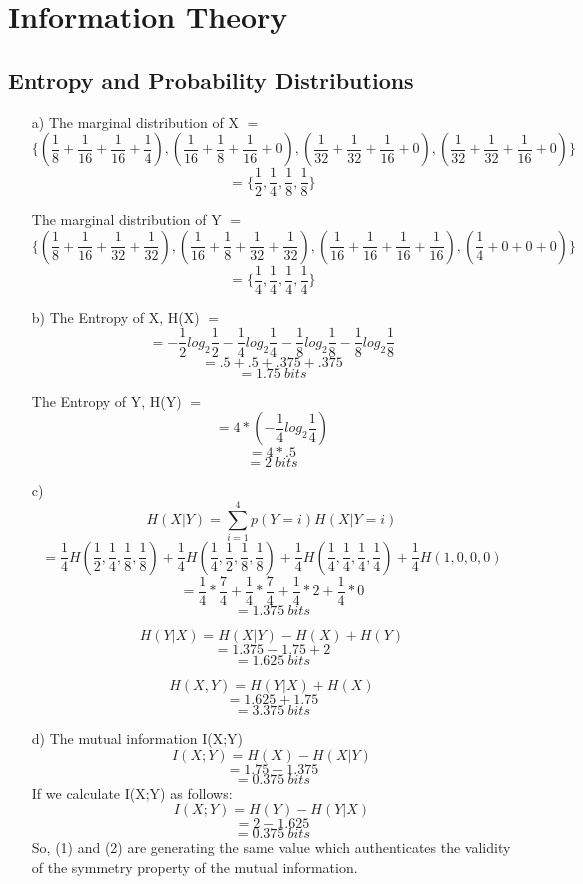 \documentclass{article}
\begin{document}
\section{Information Theory}
\subsection{Entropy and Probability Distributions}
\begin{itemize}
	\item[a)]
	The marginal distribution of X $=$ $$\{(\frac{1}{8}+\frac{1}{16}+\frac{1}{16}+\frac{1}{4}),(\frac{1}{16}+\frac{1}{8}+\frac{1}{16}+0),(\frac{1}{32}+\frac{1}{32}+\frac{1}{16}+0),(\frac{1}{32}+\frac{1}{32}+\frac{1}{16}+0)\}$$
	$$=\{\frac{1}{2},\frac{1}{4},\frac{1}{8},\frac{1}{8}\}$$
	
	The marginal distribution of Y $=$ $$\{(\frac{1}{8}+\frac{1}{16}+\frac{1}{32}+\frac{1}{32}),(\frac{1}{16}+\frac{1}{8}+\frac{1}{32}+\frac{1}{32}),(\frac{1}{16}+\frac{1}{16}+\frac{1}{16}+\frac{1}{16}),(\frac{1}{4}+0+0+0)\}$$
	$$=\{\frac{1}{4},\frac{1}{4},\frac{1}{4},\frac{1}{4}\}$$
	
	\item[b)]
	The Entropy of X, H(X) $=$ 
	$$=-\frac{1}{2}log_2\frac{1}{2}-\frac{1}{4}log_2\frac{1}{4}-\frac{1}{8}log_2\frac{1}{8}-\frac{1}{8}log_2\frac{1}{8}$$
	$$=.5+.5+.375+.375$$
	$$=1.75\: bits$$
	
	The Entropy of Y, H(Y) $=$ 
	$$=4*(-\frac{1}{4}log_2\frac{1}{4})$$
	$$=4*.5$$
	$$=2\: bits$$
	\item[c)]
	$$H(X|Y)=\sum_{i=1}^{4} p(Y=i) H(X|Y=i)$$
	$$=\frac{1}{4}H(\frac{1}{2},\frac{1}{4},\frac{1}{8},\frac{1}{8})+\frac{1}{4}H(\frac{1}{4},\frac{1}{2},\frac{1}{8},\frac{1}{8})+\frac{1}{4}H(\frac{1}{4},\frac{1}{4},\frac{1}{4},\frac{1}{4})+\frac{1}{4}H(1,0,0,0)$$
	$$=\frac{1}{4}*\frac{7}{4}+\frac{1}{4}*\frac{7}{4}+\frac{1}{4}*2+\frac{1}{4}*0$$
	$$=1.375\:bits$$
	
	$$H(Y|X)=H(X|Y)-H(X)+H(Y)$$
	$$=1.375-1.75+2$$
	$$=1.625\:bits$$
	
	$$H(X,Y)=H(Y|X)+H(X)$$
	$$=1.625+1.75$$
	$$=3.375\:bits$$
	\item[d)]
	The mutual information I(X;Y)
	\begin{equation} 
    I(X;Y)=H(X)-H(X|Y)
    \end{equation}
	$$=1.75-1.375$$
	$$=0.375\: bits$$
	If we calculate I(X;Y) as follows:
	\begin{equation} 
    I(X;Y)=H(Y)-H(Y|X)
    \end{equation}
    $$=2-1.625$$
	$$=0.375\: bits$$
    So, (1) and (2) are generating the same value which authenticates the validity of the symmetry property of the mutual information.
\end{itemize}
\end{document}
